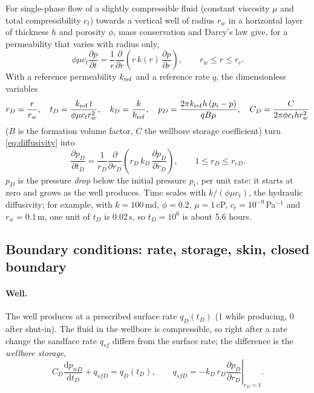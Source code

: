 \documentclass[11pt]{article}
\newcommand{\dd}{\mathrm{d}}
\newcommand{\reD}{r_{eD}}
\begin{document}
For single-phase flow of a slightly compressible fluid (constant viscosity $\mu$ and total compressibility $c_t$)
towards a vertical well of radius $r_w$ in a horizontal layer of thickness $h$ and porosity $\phi$, mass
conservation and Darcy's law give, for a permeability that varies with radius only,
\begin{equation}
  \phi \mu c_t \frac{\partial p}{\partial t} = \frac{1}{r}\frac{\partial}{\partial r}\!\left(r\,k(r)\,
  \frac{\partial p}{\partial r}\right), \qquad r_w \le r \le r_e .
  \label{eq:diffusivity}
\end{equation}
With a reference permeability $k_{\rm ref}$ and a reference rate $q$, the dimensionless variables
\begin{equation}
  r_D = \frac{r}{r_w},\quad
  t_D = \frac{k_{\rm ref}\, t}{\phi\mu c_t r_w^2},\quad
  k_D = \frac{k}{k_{\rm ref}},\quad
  p_D = \frac{2\pi k_{\rm ref} h\,(p_i - p)}{q B \mu},\quad
  C_D = \frac{C}{2\pi \phi c_t h r_w^2}
  \label{eq:dimless}
\end{equation}
($B$ is the formation volume factor, $C$ the wellbore storage coefficient) turn \eqref{eq:diffusivity} into
\begin{equation}
  \frac{\partial p_D}{\partial t_D} = \frac{1}{r_D}\frac{\partial}{\partial r_D}\!\left(r_D\,k_D\,
  \frac{\partial p_D}{\partial r_D}\right), \qquad 1 \le r_D \le \reD .
  \label{eq:diffD}
\end{equation}
$p_D$ is the pressure \emph{drop} below the initial pressure $p_i$, per unit rate: it starts at zero and grows as
the well produces. Time scales with $k/(\phi\mu c_t)$, the hydraulic diffusivity; for example, with
$k = 100$\,md, $\phi = 0.2$, $\mu = 1$\,cP, $c_t = 10^{-9}$\,Pa$^{-1}$ and $r_w = 0.1$\,m, one unit of $t_D$ is
0.02\,s, so $t_D = 10^6$ is about 5.6 hours.

\subsection{Boundary conditions: rate, storage, skin, closed boundary}

\paragraph{Well.} The well produces at a prescribed surface rate $q_D(t_D)$ (1 while producing, 0 after
shut-in). The fluid in the wellbore is compressible, so right after a rate change the sandface rate
$q_{sf}$ differs from the surface rate; the difference is the \emph{wellbore storage},
\begin{equation}
  C_D \frac{\dd p_{wD}}{\dd t_D} + q_{sfD} = q_D(t_D), \qquad
  q_{sfD} = -\left. k_D\, r_D \frac{\partial p_D}{\partial r_D}\right|_{r_D=1} .
  \label{eq:storage}
\end{equation}
\end{document}
